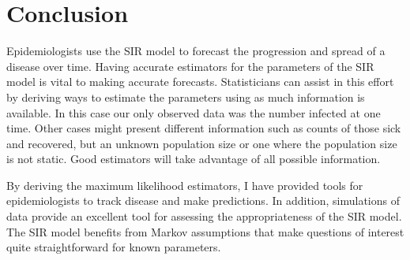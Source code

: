 \documentclass{svproc}
\begin{document}
\section{Conclusion}
Epidemiologists use the SIR model to forecast the progression and spread of a disease over time. Having accurate estimators for the parameters of the SIR model is vital to making accurate forecasts. Statisticians can assist in this effort by deriving ways to estimate the parameters using as much information is available. In this case our only observed data was the number infected at one time. Other cases might present different information such as counts of those sick and recovered, but an unknown population size or one where the population size is not static. Good estimators will take advantage of all possible information. 

By deriving the maximum likelihood estimators, I have provided tools for epidemiologists to track disease and make predictions. In addition, simulations of data provide an excellent tool for assessing the appropriateness of the SIR model. The SIR model benefits from Markov assumptions that make questions of interest quite straightforward for known parameters. 
\end{document}

